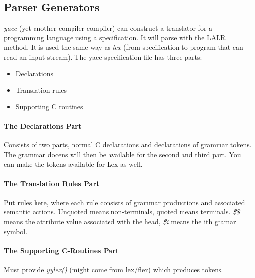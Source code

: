 \documentclass{article}
\begin{document}
\subsection{Parser Generators} %
\label{sub:Parser Generators}
\emph{yacc} (yet another compiler-compiler) can construct a translator for a programming language using a specification. It will parse with the LALR method. It is used the same way as \emph{lex} (from specification to program that can read an input stream). The yacc specification file has three parts:
\begin{itemize}
	\item Declarations
	\item Translation rules
	\item Supporting C routines
\end{itemize}

\paragraph{The Declarations Part} %
\label{par:The Declarations Part}
Consists of two parts, normal C declarations and declarations of grammar tokens. The grammar docens will then be available for the second and third part. You can make the tokens available for Lex as well.

\paragraph{The Translation Rules Part} %
\label{par:The Translation Rules Part}
Put rules here, where each rule consists of grammar productions and associated semantic actions. Unquoted means non-terminals, quoted means terminals. \emph{\$\$} means the attribute value associated with the head, \emph{\$i} means the ith gramar symbol.
\paragraph{The Supporting C-Routines Part} %
\label{par:The Supporting C-Routines Part}
Must provide \emph{yylex()} (might come from lex/flex) which produces tokens.
\end{document}
